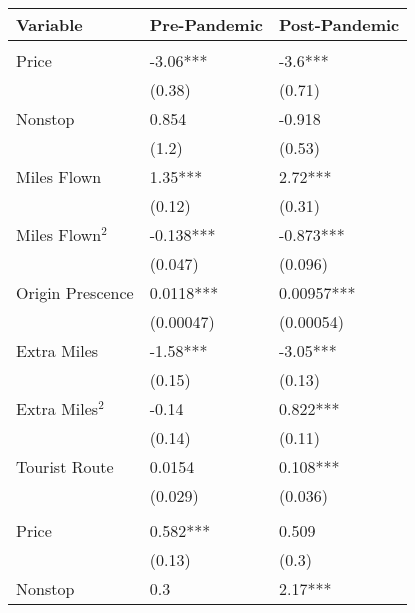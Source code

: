 
\begin{tabular}[t]{lll}
\toprule
Variable & Pre-Pandemic & Post-Pandemic\\
\midrule
\addlinespace[0.3em]
\multicolumn{3}{l}{\textbf{Linear Coefficients}}\\
\hspace{1em}Price & -3.06*** & -3.6***\\
\hspace{1em} & (0.38) & (0.71)\\
\hspace{1em}Nonstop & 0.854 & -0.918\\
\hspace{1em} & (1.2) & (0.53)\\
\hspace{1em}Miles Flown & 1.35*** & 2.72***\\
\hspace{1em} & (0.12) & (0.31)\\
\hspace{1em}Miles Flown$^2$ & -0.138*** & -0.873***\\
\hspace{1em} & (0.047) & (0.096)\\
\hspace{1em}Origin Prescence & 0.0118*** & 0.00957***\\
\hspace{1em} & (0.00047) & (0.00054)\\
\hspace{1em}Extra Miles & -1.58*** & -3.05***\\
\hspace{1em} & (0.15) & (0.13)\\
\hspace{1em}Extra Miles$^2$ & -0.14 & 0.822***\\
\hspace{1em} & (0.14) & (0.11)\\
\hspace{1em}Tourist Route & 0.0154 & 0.108***\\
\hspace{1em} & (0.029) & (0.036)\\
\midrule
\addlinespace[0.3em]
\multicolumn{3}{l}{\textbf{Nonlinear Coefficients}}\\
\hspace{1em}Price & 0.582*** & 0.509\\
\hspace{1em} & (0.13) & (0.3)\\
\hspace{1em}Nonstop & 0.3 & 2.17***\\

\end{tabular}
